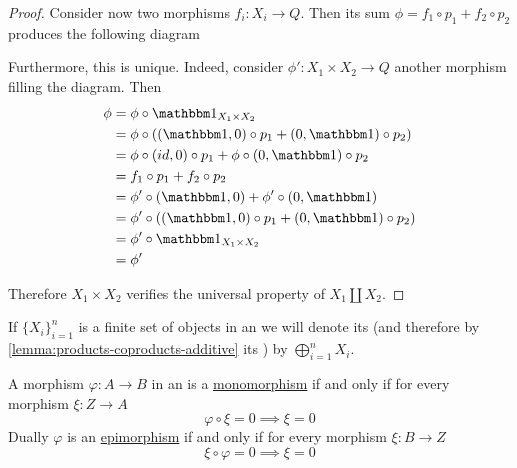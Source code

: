 \documentclass[../../main]{subfiles}
\begin{document}
\begin{proof}
  Consider now two morphisms \(f_{i}: X_{i} \to Q\).
  Then its sum \(\phi = f_{1} \circ p_{1} + f_{2} \circ p_{2}\) produces the following diagram
  \begin{center}
  \end{center}
  Furthermore, this is unique.
  Indeed, consider \(\phi': X_{1} \times X_{2} \to Q\) another morphism filling the diagram. Then
  \begin{align*}
    \phi &= \phi \circ \id_{X_{1} \times X_{2}} \\
      &= \phi \circ ( (\id, 0) \circ p_{1} + (0, \id) \circ p_{2} ) \\
      &= \phi \circ (id, 0) \circ p_{1} + \phi \circ (0, \id) \circ p_{2} \\
      &= f_{1} \circ p_{1} + f_{2} \circ p_{2} \\
      &= \phi' \circ (\id, 0) + \phi' \circ (0, \id) \\
      &= \phi' \circ ( (\id, 0) \circ p_{1} + (0, \id) \circ p_{2} ) \\
      &= \phi' \circ \id_{X_{1} \times X_{2}} \\
      &= \phi'
  \end{align*}

  Therefore \(X_{1} \times X_{2}\) verifies the universal property of \(X_{1} \amalg X_{2}\).
\end{proof}

\begin{notation}
  If \(\{X_{i}\}_{i=1}^{n}\) is a finite set of objects in an  we will denote its  (and therefore by \autoref{lemma:products-coproducts-additive} its ) by \(\bigoplus_{i=1}^{n} X_{i}\).
\end{notation}

\begin{lemma} \label{lemma:mono-epi-additive}
  A morphism \(\varphi: A \to B\) in an  is a \hyperref[def:mono-epi-morphism]{monomorphism} if and only if for every morphism \(\xi: Z \to A\)
  \begin{equation*}
    \varphi \circ \xi = 0 \implies \xi = 0
  \end{equation*}
  Dually \(\varphi\) is an \hyperref[def:mono-epi-morphism]{epimorphism} if and only if for every morphism \(\xi: B \to Z\)
  \begin{equation*}
    \xi \circ \varphi = 0 \implies \xi = 0
  \end{equation*}
\end{lemma}
\end{document}
